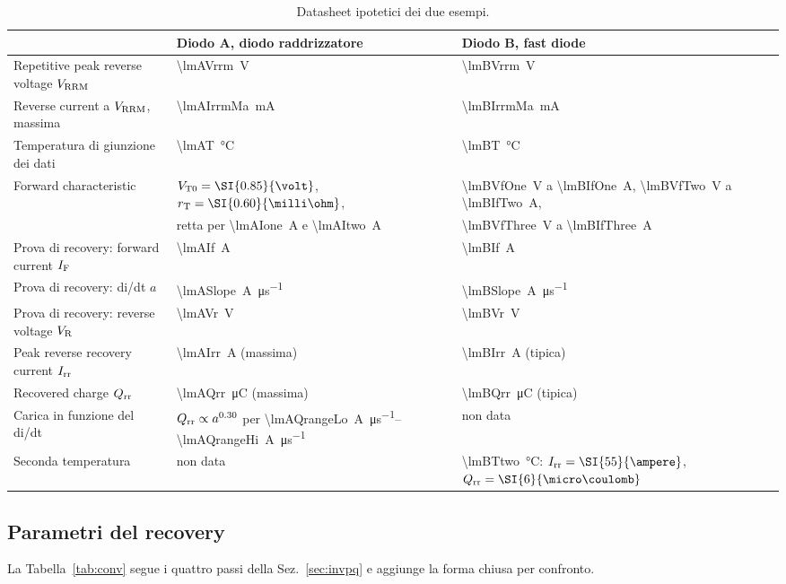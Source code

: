 \documentclass[10pt,a4paper]{scrartcl}
\let\newcommand\pdvaluedefine
\newcommand{\IF}{I_\mathrm{F}}
\newcommand{\VR}{V_\mathrm{R}}
\newcommand{\Irr}{I_\mathrm{rr}}
\newcommand{\Qrr}{Q_\mathrm{rr}}
\newcommand{\VTo}{V_\mathrm{T0}}
\newcommand{\rT}{r_\mathrm{T}}
\newcommand{\Vrrm}{V_\mathrm{RRM}}
\begin{document}
\begin{table}[htb]
\centering\small
\caption{Datasheet ipotetici dei due esempi.}
\label{tab:data}
\begin{tabular}{@{}lll@{}}
\toprule
 & Diodo A, diodo raddrizzatore & Diodo B, fast diode \\
\midrule
Repetitive peak reverse voltage $\Vrrm$ & \SI{\lmAVrrm}{\volt} & \SI{\lmBVrrm}{\volt} \\
Reverse current a $\Vrrm$, massima & \SI{\lmAIrrmMa}{\milli\ampere} & \SI{\lmBIrrmMa}{\milli\ampere} \\
Temperatura di giunzione dei dati & \SI{\lmAT}{\celsius} & \SI{\lmBT}{\celsius} \\
Forward characteristic & $\VTo = \SI{\lmAVto}{\volt}$, $\rT = \SI{\lmARt}{\milli\ohm}$, & \SI{\lmBVfOne}{\volt} a \SI{\lmBIfOne}{\ampere}, \SI{\lmBVfTwo}{\volt} a \SI{\lmBIfTwo}{\ampere}, \\
 & retta per \SI{\lmAIone}{\ampere} e \SI{\lmAItwo}{\ampere} & \SI{\lmBVfThree}{\volt} a \SI{\lmBIfThree}{\ampere} \\
Prova di recovery: forward current $\IF$ & \SI{\lmAIf}{\ampere} & \SI{\lmBIf}{\ampere} \\
Prova di recovery: di/dt $a$ & \SI{\lmASlope}{\ampere\per\micro\second} & \SI{\lmBSlope}{\ampere\per\micro\second} \\
Prova di recovery: reverse voltage $\VR$ & \SI{\lmAVr}{\volt} & \SI{\lmBVr}{\volt} \\
Peak reverse recovery current $\Irr$ & \SI{\lmAIrr}{\ampere} (massima) & \SI{\lmBIrr}{\ampere} (tipica) \\
Recovered charge $\Qrr$ & \SI{\lmAQrr}{\micro\coulomb} (massima) & \SI{\lmBQrr}{\micro\coulomb} (tipica) \\
Carica in funzione del di/dt & $\Qrr \propto a^{\lmAQexp}$ per \SIrange{\lmAQrangeLo}{\lmAQrangeHi}{\ampere\per\micro\second} & non data \\
Seconda temperatura & non data & \SI{\lmBTtwo}{\celsius}: $\Irr = \SI{\lmBIrrTtwo}{\ampere}$, $\Qrr = \SI{\lmBQrrTtwo}{\micro\coulomb}$ \\
\bottomrule
\end{tabular}
\end{table}

\subsection{Parametri del recovery}
\label{sec:exrec}
La Tabella~\ref{tab:conv} segue i quattro passi della Sez.~\ref{sec:invpq} e aggiunge la forma chiusa per confronto.
\end{document}
